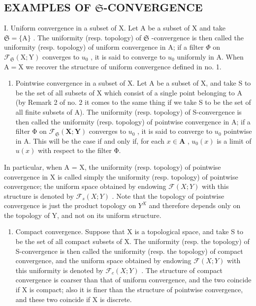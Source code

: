 \subsection{\texorpdfstring{EXAMPLES OF \(\mathfrak{S}\)-CONVERGENCE}{EXAMPLES OF S-CONVERGENCE}}

I. Uniform convergence in a subset of X. Let A be a subset of X and take \(\mathfrak{S} = \{\mathrm{A}\}\) . The uniformity (resp. topology) of \(\mathfrak{S}\) -convergence is then called the uniformity (resp. topology) of uniform convergence in A; if a filter \(\Phi\) on \(\mathcal{F}_{\mathfrak{S}}(\mathrm{X};\mathrm{Y})\) converges to \(u_0\) , it is said to converge to \(u_0\) uniformly in A. When \(\mathrm{A} = \mathrm{X}\) we recover the structure of uniform convergence defined in no. 1.

\begin{enumerate}
\def\labelenumi{\Roman{enumi}.}
\setcounter{enumi}{1}
\tightlist
\item
  Pointwise convergence in a subset of X. Let A be a subset of X, and take S to be the set of all subsets of X which consist of a single point belonging to A (by Remark 2 of no. 2 it comes to the same thing if we take S to be the set of all finite subsets of A). The uniformity (resp. topology) of S-convergence is then called the uniformity (resp. topology) of pointwise convergence in A; if a filter Φ on \(\mathcal{F}_{\mathfrak{S}}(\mathbf{X};\mathbf{Y})\) converges to \(u_0\) , it is said to converge to \(u_0\) pointwise in A. This will be the case if and only if, for each \(x\in \mathbf{A}\) , \(u_0(x)\) is a limit of \(u(x)\) with respect to the filter Φ.
\end{enumerate}

In particular, when A = X, the uniformity (resp. topology) of pointwise convergence in X is called simply the uniformity (resp. topology) of pointwise convergence; the uniform space obtained by endowing \(\mathcal{F}(X; Y)\) with this structure is denoted by \(\mathcal{F}_{s}(X; Y)\) . Note that the topology of pointwise convergence is just the product topology on \(Y^{X}\) and therefore depends only on the topology of Y, and not on its uniform structure.

\begin{enumerate}
\def\labelenumi{\Roman{enumi}.}
\setcounter{enumi}{2}
\tightlist
\item
  Compact convergence. Suppose that X is a topological space, and take S to be the set of all compact subsets of X. The uniformity (resp. the topology) of S-convergence is then called the uniformity (resp. the topology) of compact convergence, and the uniform space obtained by endowing \(\mathcal{F}(X;Y)\) with this uniformity is denoted by \(\mathcal{F}_{c}(X;Y)\) . The structure of compact convergence is coarser than that of uniform convergence, and the two coincide if X is compact; also it is finer than the structure of pointwise convergence, and these two coincide if X is discrete.
\end{enumerate}

